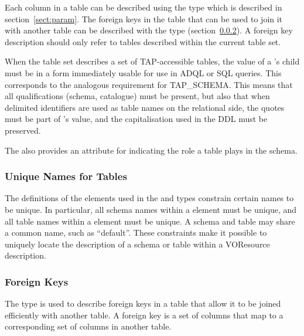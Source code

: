\documentclass[11pt,a4paper]{ivoa}
\newcommand{\tapschema}{TAP\_SCHE\-MA}
\newcommand{\tapschema}{\mbox{%
  TAP\discretionary{-}{}{\kern-2pt\_}SCHEMA}}
\begin{document}




Each column in a table can be described using the
 type which is described in
section~\ref{sect:param}.  The foreign keys in the table that
can be used to join it with another table can be described with the
 type (section~\ref{sect:fkey}).
A foreign key description should only refer to tables described within
the current table set.

When the table set describes a set of TAP-accessible tables, the value of
a 's  child must be in a form immediately
usable for use in ADQL or SQL queries. This corresponds to the analogous
requirement for \tapschema.  This means that all qualifications (schema,
catalogue) must be present, but also that when delimited
identifiers are used as table names on the relational side,
the quotes must be part of 's value, and the
capitalisation used in the DDL must be preserved.


The  also provides an attribute for indicating
the role a table plays in the schema.





\subsubsection{Unique Names for Tables}
\label{sect:unique}


The definitions of the  elements used in
the  and
 types
constrain certain names to be unique.  In particular, all schema names
within a  element must be unique, and all
table names within a  element must be
unique.  A schema and table may share a common name, such as
``default''.  These constraints make it possible to uniquely locate
the description of a schema or table within a VOResource description.


\subsubsection{Foreign Keys}
\label{sect:fkey}


The  type is used to describe foreign
keys in a table that allow it to be joined efficiently with another
table.  A foreign key is a set of columns that map to a corresponding
set of columns in another table.
\end{document}
